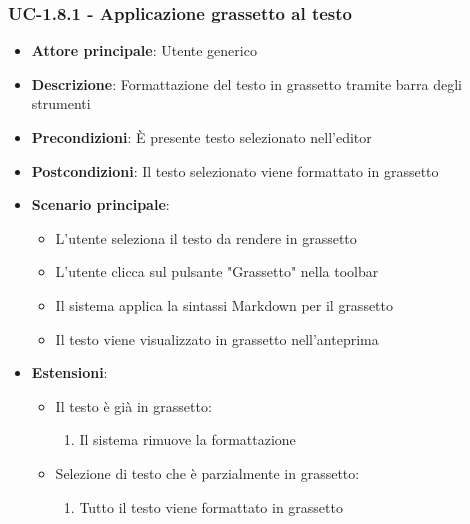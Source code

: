 \documentclass[11pt,a4paper]{article}
\begin{document}
\subsubsection{UC-1.8.1 - Applicazione grassetto al testo}
\begin{itemize}
    \item \textbf{Attore principale}: Utente generico
    \item \textbf{Descrizione}: Formattazione del testo in grassetto tramite barra degli strumenti
    \item \textbf{Precondizioni}: È presente testo selezionato nell'editor
    \item \textbf{Postcondizioni}: Il testo selezionato viene formattato in grassetto
    \item \textbf{Scenario principale}:
        \begin{itemize}
            \item L'utente seleziona il testo da rendere in grassetto
            \item L'utente clicca sul pulsante "Grassetto" nella toolbar
            \item Il sistema applica la sintassi Markdown per il grassetto
            \item Il testo viene visualizzato in grassetto nell'anteprima
        \end{itemize}
    \item \textbf{Estensioni}:
        \begin{itemize}
            \item Il testo è già in grassetto:
                \begin{enumerate}
                    \item Il sistema rimuove la formattazione
                \end{enumerate}
            \item Selezione di testo che è parzialmente in grassetto:
                \begin{enumerate}
                    \item Tutto il testo viene formattato in grassetto
                \end{enumerate}
        \end{itemize}
\end{itemize}
\end{document}
